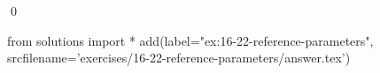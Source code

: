 
\begin{ex}
  \label{ex:16-22-reference-parameters}
  
  \qed
\end{ex}
\begin{python0}
from solutions import *
add(label="ex:16-22-reference-parameters",
    srcfilename='exercises/16-22-reference-parameters/answer.tex')
\end{python0}
